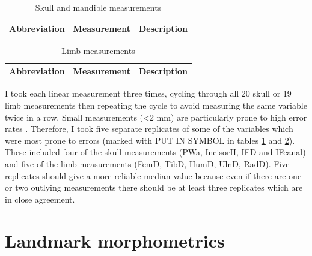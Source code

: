 \begin{table}[h]
\caption[Description of the skull and mandible measurements]
		{Skull and mandible measurements}%
\begin{tabular}{lll}
\hline
\textbf{Abbreviation} & \textbf{Measurement} & \textbf{Description}\\
\hline
\hline
\end{tabular}
\label{tab:sk.measurements}
\end{table}

\begin{table}[h]
\caption[Description of the limb measurements]
		{Limb measurements} %
\begin{tabular}{lll}
\hline
\textbf{Abbreviation} & \textbf{Measurement} & \textbf{Description}\\
\hline
\hline

\end{tabular}
\label{tab:limb.measurements}
\end{table}


I took each linear measurement three times, cycling through all 20 skull or 19 limb measurements then repeating the cycle to avoid measuring the same variable twice in a row. Small measurements (<2 mm) are particularly prone to high error rates \citep{Cardini2008}. Therefore, I took five separate replicates of some of the variables which were most prone to errors (marked with PUT IN SYMBOL in tables \ref{tab:sk.measurements} and \ref{tab:limb.measurements}). These included four of the skull measurements (PWa, IncisorH, IFD and IFcanal) and five of the limb measurements (FemD, TibD, HumD, UlnD, RadD). 
Five replicates should give a more reliable median value because even if there are one or two outlying measurements there should be at least three replicates which are in close agreement.

\section{Landmark morphometrics}
